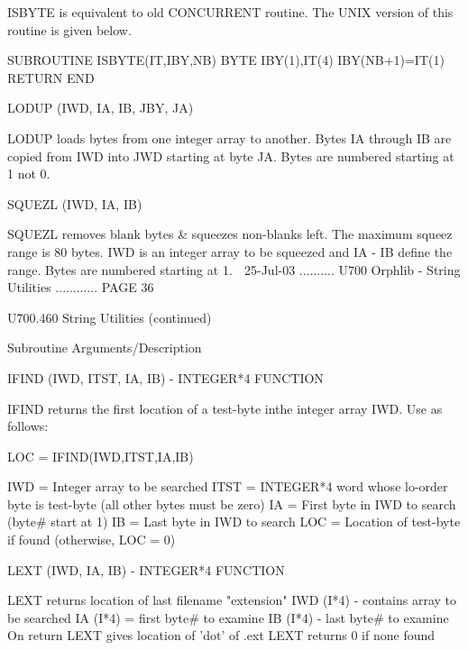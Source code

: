                        ISBYTE is equivalent to old CONCURRENT routine.
                       The UNIX version of this routine is given below.
 
                       SUBROUTINE ISBYTE(IT,IBY,NB)
                       BYTE IBY(1),IT(4)
                       IBY(NB+1)=IT(1)
                       RETURN
                       END
 
   LODUP              (IWD, IA, IB, JBY, JA)
 
                       LODUP loads bytes from one integer array to another.
                       Bytes IA through IB are copied from IWD into JWD
                       starting at byte JA.
                       Bytes are numbered starting at 1 not 0.
 
   SQUEZL             (IWD, IA, IB)
 
                       SQUEZL removes blank bytes & squeezes non-blanks left.
                       The maximum squeez range is 80 bytes.
                       IWD is an integer array to be squeezed and IA - IB
                       define the range. Bytes are numbered starting at 1.
    
   25-Jul-03 .......... U700  Orphlib - String Utilities ............ PAGE  36
 
 
   U700.460  String Utilities (continued)
 
   Subroutine          Arguments/Description
 
   IFIND              (IWD, ITST, IA, IB)  -  INTEGER*4 FUNCTION
 
                       IFIND returns the first location of a test-byte inthe
                       integer array IWD. Use as follows:
 
                       LOC = IFIND(IWD,ITST,IA,IB)
 
                       IWD  = Integer array to be searched
                       ITST = INTEGER*4 word whose lo-order byte is test-byte
                              (all other bytes must be zero)
                       IA   = First byte in IWD to search (byte# start at 1)
                       IB   = Last  byte in IWD to search
                       LOC  = Location of test-byte if found (otherwise, LOC = 0)
 
   LEXT               (IWD, IA, IB)        -  INTEGER*4 FUNCTION
 
                       LEXT returns location of last filename "extension"
                       IWD (I*4) - contains array to be searched
                       IA  (I*4) = first byte# to examine
                       IB  (I*4) - last  byte# to examine
                       On return LEXT gives location of 'dot' of .ext
                       LEXT returns 0 if none found
 
